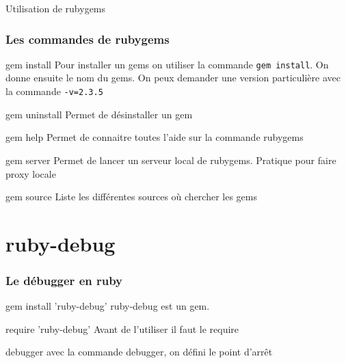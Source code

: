 \documentclass{beamer}
\begin{document}
\begin{frame}
  \begin{beamerboxesrounded}{Utilisation de rubygems}
    
  \end{beamerboxesrounded}
\end{frame}

\begin{frame}
  \frametitle{Les commandes de rubygems}
  \begin{block}{gem install}
    Pour installer un gems on utiliser la commande \verb?gem install?. On
    donne ensuite le nom du gems. On peux demander une version
    particulière avec la commande \verb?-v=2.3.5?
  \end{block}
  \begin{block}{gem uninstall}
    Permet de d\'esinstaller un gem
  \end{block}
  \begin{block}{gem help}
    Permet de connaitre toutes l'aide sur la commande rubygems
  \end{block}
\end{frame}

\begin{frame}
  \begin{block}{gem server}
    Permet de lancer un serveur local de rubygems. Pratique pour faire proxy locale
  \end{block}
  \begin{block}{gem source}
    Liste les diff\'erentes sources où chercher les gems
  \end{block}
\end{frame}


\section{ruby-debug}

\begin{frame}
  \frametitle{Le d\'ebugger en ruby}
  \begin{block}{gem install 'ruby-debug'}
    ruby-debug est un gem.
  \end{block}
  \begin{block}{require 'ruby-debug'}
    Avant de l'utiliser il faut le require
  \end{block}
  \begin{block}{debugger}
    avec la commande debugger, on d\'efini le point d'arrêt
  \end{block}
\end{frame}
\end{document}
